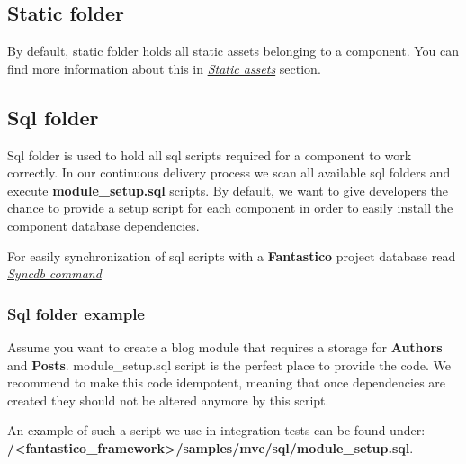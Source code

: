 \documentclass[letterpaper,10pt,english]{sphinxmanual}
\begin{document}
\subsection{Static folder}
\label{features/component_model:static-folder}
By default, static folder holds all static assets belonging to a component. You can find more information about this
in {\hyperref[how_to/static_assets::doc]{\emph{Static assets}}} section.


\subsection{Sql folder}
\label{features/component_model:sql-folder}
Sql folder is used to hold all sql scripts required for a component to work correctly. In our continuous delivery
process we scan all available sql folders and execute \textbf{module\_setup.sql} scripts. By default, we want to give
developers the chance to provide a setup script for each component in order to easily install the component database
dependencies.

For easily synchronization of sql scripts with a \textbf{Fantastico} project database read {\hyperref[features/sdk/command_syncdb::doc]{\emph{Syncdb command}}}


\subsubsection{Sql folder example}
\label{features/component_model:sql-folder-example}
Assume you want to create a blog module that requires a storage for \textbf{Authors} and \textbf{Posts}. module\_setup.sql script
is the perfect place to provide the code. We recommend to make this code idempotent, meaning that once dependencies are
created they should not be altered anymore by this script.

An example of such a script we use in integration tests can be found under: \textbf{/\textless{}fantastico\_framework\textgreater{}/samples/mvc/sql/module\_setup.sql}.
\end{document}
